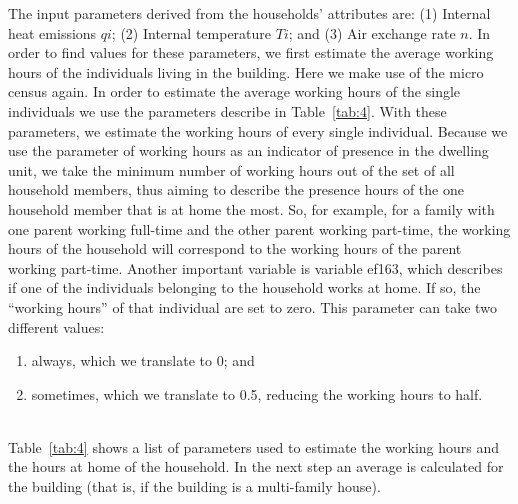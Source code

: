 \documentclass[11pt]{IJM-article}
\begin{document}
The input parameters derived from the households' attributes are: (1) Internal
heat emissions $qi$; (2) Internal temperature $Ti$; and (3) Air exchange rate
$n$. In order to find values for these parameters, we first estimate the
average working hours of the individuals living in the building.  Here we make
use of the micro census again. In order to estimate the average working hours
of the single individuals we use the parameters describe in Table~\ref{tab:4}.
With these parameters, we estimate the working hours of every single
individual. Because we use the parameter of working hours as an indicator of
presence in the dwelling unit, we take the minimum number of working hours out
of the set of all household members, thus aiming to describe the presence hours
of the one household member that is at home the most. So, for example, for a
family with one parent working full-time and the other parent working
part-time, the working hours of the household will correspond to the working
hours of the parent working part-time. Another important variable is variable
ef163, which describes if one of the individuals belonging to the household
works at home. If so, the ``working hours'' of that individual are set to zero.
This parameter can take two different values:

\begin{enumerate}
    \item always, which we translate to 0; and
    \item sometimes, which we translate to 0.5, reducing the working hours to
        half.
\end{enumerate}\\

Table~\ref{tab:4} shows a list of parameters used to estimate the working hours
and the hours at home of the household. In the next step an average is
calculated for the building (that is, if the building is a multi-family
house).\\
\end{document}
